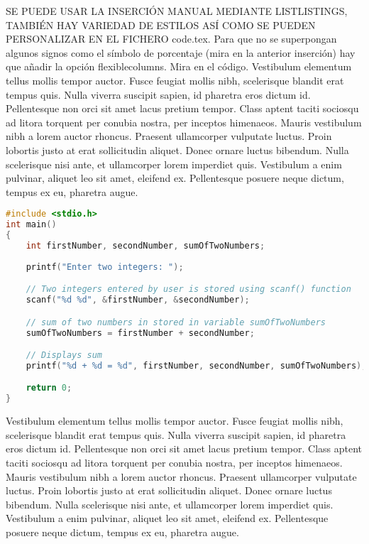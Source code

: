 SE PUEDE USAR LA INSERCIÓN MANUAL MEDIANTE LISTLISTINGS, TAMBIÉN HAY VARIEDAD DE ESTILOS ASÍ COMO SE PUEDEN PERSONALIZAR EN EL FICHERO  code.tex.
Para que no se superpongan algunos signos como el símbolo de porcentaje (mira en la anterior inserción) hay que añadir la opción flexiblecolumns. Mira en el código.
Vestibulum elementum tellus mollis tempor auctor. Fusce feugiat mollis nibh, scelerisque blandit erat tempus quis. Nulla viverra suscipit sapien, id pharetra eros dictum id. Pellentesque non orci sit amet lacus pretium tempor. Class aptent taciti sociosqu ad litora torquent per conubia nostra, per inceptos himenaeos. Mauris vestibulum nibh a lorem auctor rhoncus. Praesent ullamcorper vulputate luctus. Proin lobortis justo at erat sollicitudin aliquet. Donec ornare luctus bibendum. Nulla scelerisque nisi ante, et ullamcorper lorem imperdiet quis. Vestibulum a enim pulvinar, aliquet leo sit amet, eleifend ex. Pellentesque posuere neque dictum, tempus ex eu, pharetra augue.

\begin{lstlisting}[language=C,style=no-color-frame  ,caption=Ejercio de prueba \cite{web:vimgolf}]
#include <stdio.h>
int main()
{
    int firstNumber, secondNumber, sumOfTwoNumbers;
    
    printf("Enter two integers: ");

    // Two integers entered by user is stored using scanf() function
    scanf("%d %d", &firstNumber, &secondNumber);

    // sum of two numbers in stored in variable sumOfTwoNumbers
    sumOfTwoNumbers = firstNumber + secondNumber;

    // Displays sum      
    printf("%d + %d = %d", firstNumber, secondNumber, sumOfTwoNumbers);

    return 0;
}
\end{lstlisting}

Vestibulum elementum tellus mollis tempor auctor. Fusce feugiat mollis nibh, scelerisque blandit erat tempus quis. Nulla viverra suscipit sapien, id pharetra eros dictum id. Pellentesque non orci sit amet lacus pretium tempor. Class aptent taciti sociosqu ad litora torquent per conubia nostra, per inceptos himenaeos. Mauris vestibulum nibh a lorem auctor rhoncus. Praesent ullamcorper vulputate luctus. Proin lobortis justo at erat sollicitudin aliquet. Donec ornare luctus bibendum. Nulla scelerisque nisi ante, et ullamcorper lorem imperdiet quis. Vestibulum a enim pulvinar, aliquet leo sit amet, eleifend ex. Pellentesque posuere neque dictum, tempus ex eu, pharetra augue.

